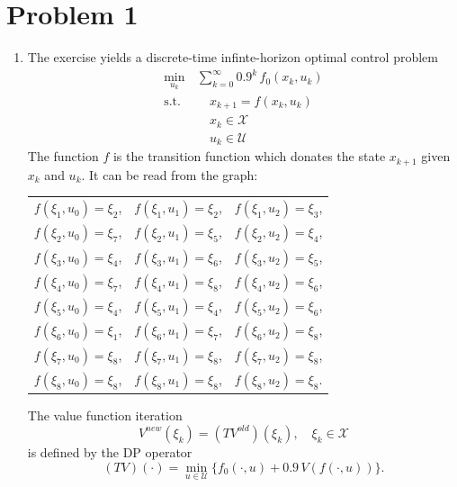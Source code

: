 \documentclass[12pt,pdftex,a4paper]{scrartcl}
\begin{document}
\section*{Problem 1}
\begin{enumerate}

	\item The exercise yields a discrete-time infinte-horizon optimal control problem
	\begin{equation*}
		\begin{split}
			\min_{u_k} \,& \sum_{k=0}^\infty 0.9^k\,f_0(x_k,u_k) \\
			\text{s.t.} & \quad x_{k+1} = f(x_k,u_k) \\
			& \quad x_k \in \mathcal{X} \\
			& \quad u_k \in \mathcal{U}
		\end{split}
	\end{equation*}
	The function $f$ is the transition function which donates the state $x_{k+1}$ given $x_k$ and $u_k$. It can be read from the graph:
	
	\begin{center}
	\begin{tabular}{ l c r }
    $f(\xi_1, u_0) = \xi_2$, & $f(\xi_1, u_1) = \xi_2$, & $f(\xi_1, u_2) = \xi_3$, \\
	$f(\xi_2, u_0) = \xi_7$, & $f(\xi_2, u_1) = \xi_5$, & $f(\xi_2, u_2) = \xi_4$, \\
	$f(\xi_3, u_0) = \xi_4$, & $f(\xi_3, u_1) = \xi_6$, & $f(\xi_3, u_2) = \xi_5$, \\
	$f(\xi_4, u_0) = \xi_7$, & $f(\xi_4, u_1) = \xi_8$, & $f(\xi_4, u_2) = \xi_6$, \\
	$f(\xi_5, u_0) = \xi_4$, & $f(\xi_5, u_1) = \xi_4$, & $f(\xi_5, u_2) = \xi_6$, \\
	$f(\xi_6, u_0) = \xi_1$, & $f(\xi_6, u_1) = \xi_7$, & $f(\xi_6, u_2) = \xi_8$, \\
	$f(\xi_7, u_0) = \xi_8$, & $f(\xi_7, u_1) = \xi_8$, & $f(\xi_7, u_2) = \xi_8$, \\
	$f(\xi_8, u_0) = \xi_8$, & $f(\xi_8, u_1) = \xi_8$, & $f(\xi_8, u_2) = \xi_8$. \\
    \end{tabular}
	\end{center}
	
	The value function iteration
	\begin{equation*}
		V^{new}(\xi_k) = (TV^{old})(\xi_k), \quad \xi_k \in \mathcal{X}
	\end{equation*}
	is defined by the DP operator
	\begin{equation*}
		(TV)(\cdot ) = \min_{u\in\mathcal{U}}\{ f_0(\cdot , u) + 0.9\,V(f(\cdot , u))\}.
	\end{equation*}
	

\end{enumerate}
\end{document}
